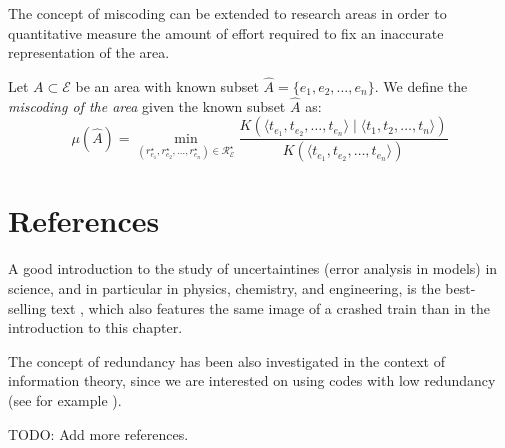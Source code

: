 {\color{red}

The concept of miscoding can be extended to research areas in order to quantitative measure the amount of effort required to fix an inaccurate representation of the area.

\begin{definition}
Let $A \subset \mathcal{E}$ be an area with known subset $\hat{A} = \{e_1, e_2, \ldots, e_n\}$. We define the \emph{miscoding of the area} given the known subset $\hat{A}$ as:
\[
\mu(\hat{A}) = \min_{(r^\star_{e_1}, r^\star_{e_2}, \ldots, r^\star_{e_n}) \in \mathcal{R}^\star_\mathcal{E}}  \frac{K \left( \langle t_{e_1}, t_{e_2}, \ldots, t_{e_n} \rangle \mid \langle t_1, t_2, \ldots, t_n \rangle \right) }{K \left( \langle t_{e_1}, t_{e_2}, \ldots, t_{e_n} \rangle \right)}
\]
\end{definition}

}

%
%

\section*{References}

A good introduction to the study of uncertaintines (error analysis in models) in science, and in particular in physics, chemistry, and engineering, is the best-selling text \cite{taylor2022introduction}, which also features the same image of a crashed train than in the introduction to this chapter.

The concept of redundancy has been also investigated in the context of information theory, since we are interested on using codes with low redundancy (see for example \cite{abramson1963information}).

{\color{red} TODO: Add more references.}
